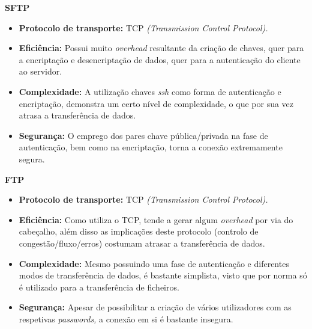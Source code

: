         \vspace{5pt}
        \textbf{\large SFTP}
        
        \begin{itemize}
            
            \item \textbf{Protocolo de transporte:} TCP \textit{(Transmission Control Protocol).} 
            
            \item \textbf{Eficiência:} Possui muito \textit{overhead} resultante da criação de chaves, quer para a encriptação e desencriptação de dados, quer para a autenticação do cliente ao servidor.  
            
            \item \textbf{Complexidade:} A utilização chaves \textit{ssh} como forma de autenticação e encriptação, demonstra um certo nível de complexidade, o que por sua vez atrasa a transferência de dados.
            
            \item \textbf{Segurança:} O emprego dos pares chave pública/privada na fase de autenticação, bem como na encriptação, torna a conexão extremamente segura.
        
        \end{itemize}

        \textbf{\large FTP}
        \begin{itemize}
            
            \item \textbf{Protocolo de transporte:} TCP \textit{(Transmission Control Protocol).} 
            
            \item \textbf{Eficiência:} Como utiliza o TCP, tende a gerar algum \textit{overhead} por via do cabeçalho, além disso as implicações deste protocolo (controlo de congestão/fluxo/erros) costumam atrasar a transferência de dados. 
            
            \item \textbf{Complexidade:} Mesmo possuindo uma fase de autenticação e diferentes modos de transferência de dados, é bastante simplista, visto que por norma só é utilizado para a transferência de ficheiros.
            
            \item \textbf{Segurança:} Apesar de possibilitar a criação de vários utilizadores com as respetivas \textit{passwords,} a conexão em si é bastante insegura.
        
        \end{itemize}

